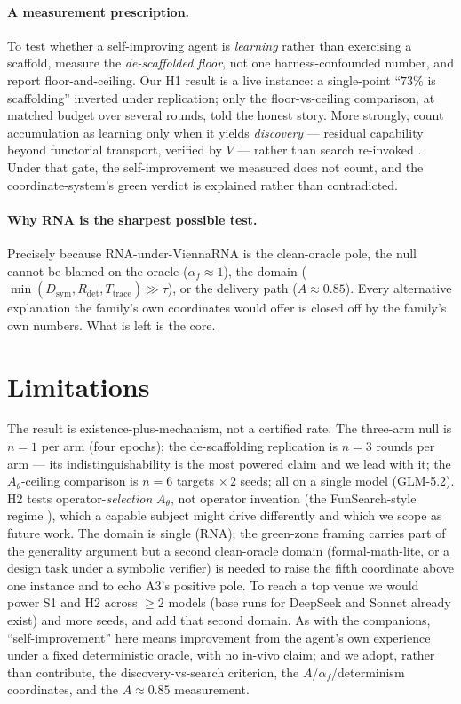 \documentclass[11pt]{article}
\newcommand{\Dsym}{D_{\mathrm{sym}}}
\newcommand{\Rdet}{R_{\mathrm{det}}}
\newcommand{\Ttrace}{T_{\mathrm{trace}}}
\newcommand{\Ath}{A_{\theta}}
\newcommand{\af}{\alpha_f}
\begin{document}
\paragraph{A measurement prescription.} To test whether a self-improving agent is \emph{learning} rather
than exercising a scaffold, measure the \emph{de-scaffolded floor}, not one harness-confounded number,
and report floor-and-ceiling. Our H1 result is a live instance: a single-point ``$73\%$ is scaffolding''
inverted under replication; only the floor-vs-ceiling comparison, at matched budget over several rounds,
told the honest story. More strongly, count accumulation as learning only when it yields \emph{discovery}
--- residual capability beyond functorial transport, verified by $V$ --- rather than search re-invoked
\citep{wangbuehler2026}. Under that gate, the self-improvement we measured does not count, and the
coordinate-system's green verdict is explained rather than contradicted.

\paragraph{Why RNA is the sharpest possible test.} Precisely because RNA-under-ViennaRNA is the
clean-oracle pole, the null cannot be blamed on the oracle ($\af\!\approx\!1$), the domain
($\min(\Dsym,\Rdet,\Ttrace)\gg\tau$), or the delivery path ($A\!\approx\!0.85$). Every alternative
explanation the family's own coordinates would offer is closed off by the family's own numbers. What is
left is the core.

\section{Limitations}\label{sec:limits}
The result is existence-plus-mechanism, not a certified rate. The three-arm null is $n\!=\!1$ per arm
(four epochs); the de-scaffolding replication is $n\!=\!3$ rounds per arm --- its indistinguishability is
the most powered claim and we lead with it; the $\Ath$-ceiling comparison is $n\!=\!6$ targets $\times\,2$
seeds; all on a single model (GLM-5.2). H2 tests operator-\emph{selection} $\Ath$, not operator
invention (the FunSearch-style regime \citep{romera2024funsearch}), which a capable subject might drive
differently and which we scope as future work. The domain is single (RNA); the green-zone framing carries
part of the generality argument but a second clean-oracle domain (formal-math-lite, or a design task
under a symbolic verifier) is needed to raise the fifth coordinate above one instance and to echo A3's
positive pole. To reach a top venue we would power S1 and H2 across $\geq2$ models (base runs for
DeepSeek and Sonnet already exist) and more seeds, and add that second domain. As with the companions,
``self-improvement'' here means improvement from the agent's own experience under a fixed deterministic
oracle, with no in-vivo claim; and we adopt, rather than contribute, the discovery-vs-search criterion,
the $A$/$\af$/determinism coordinates, and the $A\!\approx\!0.85$ measurement.
\end{document}
